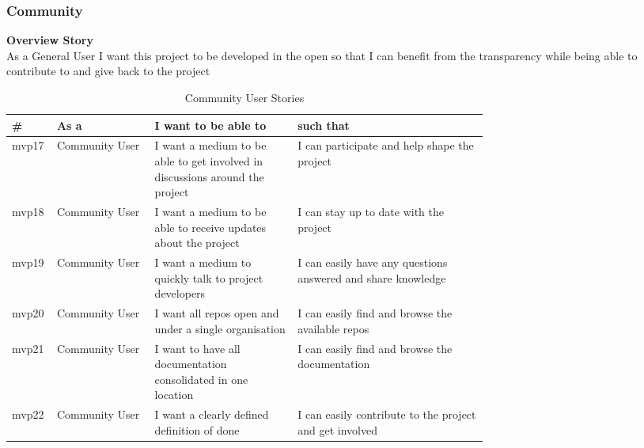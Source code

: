 \documentclass{article}
\begin{document}
\subsubsection{Community}
\label{sub:community}
\textbf{Overview Story}
\\As a General User I want this project to be developed in the open so that I can benefit from the transparency while being able to contribute to and give back to the project
\begin{table}[!ht]
\begin{tabular}{|l|l|p{0.3\linewidth}|p{0.4\linewidth}|}
\hline
\textbf{\#} & \textbf{As a}  & \textbf{I want to be able to}                                                & \textbf{such that}                                           \\ \hline
mvp17       & Community User & I want a medium to be able to get involved in discussions around the project & I can participate and help shape the project                 \\ \hline
mvp18       & Community User & I want a medium to be able to receive updates about the project              & I can stay up to date with the project                       \\ \hline
mvp19       & Community User & I want a medium to quickly talk to project developers                        & I can easily have any questions answered and share knowledge \\ \hline
mvp20       & Community User & I want all repos open and under a single organisation                       & I can easily find and browse the available repos            \\ \hline
mvp21       & Community User & I want to have all documentation consolidated in one location                & I can easily find and browse the documentation               \\ \hline
mvp22       & Community User & I want a clearly defined definition of done                                  & I can easily contribute to the project and get involved      \\ \hline
\end{tabular}
\caption{Community User Stories}
\label{tab:community}
\end{table}







\newpage

\end{document}
